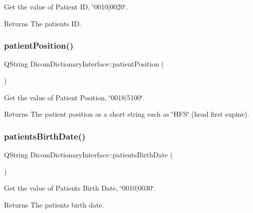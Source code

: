 Get the value of Patient ID, \char`\"{}0010$\vert$0020\char`\"{}. 

\begin{DoxyReturn}{Returns}
The patient\textquotesingle{}s ID. 
\end{DoxyReturn}
\mbox{\label{class_dicom_dictionary_interface_a8defce7dd2a8f229371ab0f2a8af39aa}} 
\subsubsection{\texorpdfstring{patient\+Position()}{patientPosition()}}
{\footnotesize\ttfamily Q\+String Dicom\+Dictionary\+Interface\+::patient\+Position (\begin{DoxyParamCaption}{ }\end{DoxyParamCaption})}



Get the value of Patient Position, \char`\"{}0018$\vert$5100\char`\"{}. 

\begin{DoxyReturn}{Returns}
The patient position as a short string such as \char`\"{}\+H\+F\+S\char`\"{} (head first supine). 
\end{DoxyReturn}
\mbox{\label{class_dicom_dictionary_interface_aad0d067a3af09163b58aadde3feb792f}} 
\subsubsection{\texorpdfstring{patients\+Birth\+Date()}{patientsBirthDate()}}
{\footnotesize\ttfamily Q\+String Dicom\+Dictionary\+Interface\+::patients\+Birth\+Date (\begin{DoxyParamCaption}{ }\end{DoxyParamCaption})}



Get the value of Patient\textquotesingle{}s Birth Date, \char`\"{}0010$\vert$0030\char`\"{}. 

\begin{DoxyReturn}{Returns}
The patient\textquotesingle{}s birth date. 
\end{DoxyReturn}
\mbox{\label{class_dicom_dictionary_interface_a1e774258d452b2054b90db885eb7915e}} 
